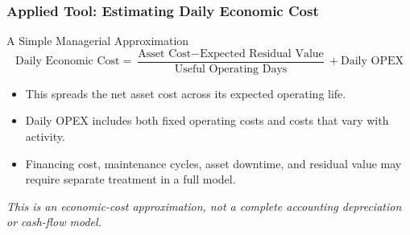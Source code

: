 \documentclass{beamer}
\begin{document}
\begin{frame}[t]
  \frametitle{Applied Tool: Estimating Daily Economic Cost}
  \begin{block}{A Simple Managerial Approximation}
  \[
    \text{Daily Economic Cost}
    =
    \frac{\text{Asset Cost}-\text{Expected Residual Value}}{\text{Useful Operating Days}}
    +\text{Daily OPEX}
  \]
  \end{block}
  \begin{itemize}
    \item This spreads the net asset cost across its expected operating life.
    \item Daily OPEX includes both fixed operating costs and costs that vary with activity.
    \item Financing cost, maintenance cycles, asset downtime, and residual value may require separate treatment in a full model.
  \end{itemize}
  \textit{This is an economic-cost approximation, not a complete accounting depreciation or cash-flow model.}
\end{frame}
\end{document}
